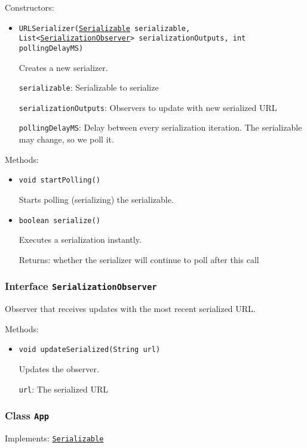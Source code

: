 Constructors:
\begin{itemize}
\item \texttt{URLSerializer(\hyperref[type:edu.kit.wavelength.client.model.serialization.Serializable]{Serializable} serializable, List<\hyperref[type:edu.kit.wavelength.client.view.SerializationObserver]{SerializationObserver}> serializationOutputs, int pollingDelayMS)}

Creates a new serializer.

\texttt{serializable}: Serializable to serialize

\texttt{serializationOutputs}: Observers to update with new serialized URL

\texttt{pollingDelayMS}: Delay between every serialization iteration. The serializable may change, so we poll it.

\end{itemize}

Methods:
\begin{itemize}
\item \texttt{void startPolling()}

Starts polling (serializing) the serializable.

\item \texttt{boolean serialize()}

Executes a serialization instantly.

Returns: whether the serializer will continue to poll after this call

\end{itemize}

\subsubsection{Interface \texttt{SerializationObserver}}
\label{type:edu.kit.wavelength.client.view.SerializationObserver}
Observer that receives updates with the most recent serialized URL.

Methods:
\begin{itemize}
\item \texttt{void updateSerialized(String url)}

Updates the observer.

\texttt{url}: The serialized URL

\end{itemize}

\subsubsection{Class \texttt{App}}
\label{type:edu.kit.wavelength.client.view.App}
Implements: \texttt{\hyperref[type:edu.kit.wavelength.client.model.serialization.Serializable]{Serializable}}


